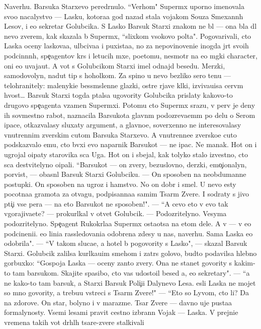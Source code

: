 \documentclass[12pt]{book}
\begin{document}
Naverhu. Barsuka Starxevo pered{\e}rnulo. ``Verhom" Superm{\yi}x uporno ime\-no\-va\-la svo{\y}o nacalystvo — Lasku, kotora{\y}a god nazad stala vojakom So{\y}uza Smexann{\yi}h Lesov, i {\y}e{\y}o sekretar{\ia} Golubcika. S Lasko{\y} Barsuk Starxi{\y} znakom ne b{\yi}l — ona b{\yi}la dl{\ia} nevo zverem, kak skazala b{\yi} Superm{\yi}x, ``slixkom v{\yi}\-so\-ko\-vo pol{\e}ta". Pogovarivali, cto Laska oceny laskova{\y}a, ul{\yi}bciva{\y}a i puxista{\y}a, no za nepovinoveni{\y}e inogda jr{\e}t svo{\y}ih podcin{\e}nn{\yi}h, spe{\c}agentov kr{\yi}s i letucih m{\yi}xe{\y}, poetomu, ne\-smo\-tr{\ia} na {\y}e{\y}o m{\ia}gki{\y} character, oni {\y}e{\y}o uvaja{\y}ut. A vot s Golubcikom Starxi{\y} imel od\-naj\-d{\yi} besedu. Merzki{\y}, samodovolyn{\yi}{\y}, nadut{\yi}{\y} tip s hoholkom. Za spino{\y} u nevo bezliko{\y} sero{\y} ten{\y}u — telohranitely: malenyki{\y}e bessm{\yi}slenn{\yi}{\y}e glazki, ostr{\yi}{\y}e rjav{\yi}{\y}e kl{\yi}ki, izviva{\y}u{\x}i{\y}sa cer\-v{\e}m hvost… Barsuk Starxi{\y} togda p{\yi}talsa ugovority Golubcika prislaty kakovo-to drugovo spe{\c}agenta vzamen Superm{\yi}xi. Potomu cto Superm{\yi}x srazu, v perv{\yi}{\y} je deny ih sovmestno{\y} rabot{\yi}, naznacila Barsukota glavn{\yi}m po\-do\-zre\-va\-{\y}e\-m{\yi}m po delu o Serom {\X}ipace, otkaz{\yi}valasy sluxaty argument{\yi}, a glavno{\y}e, soverxenno ne interesovalasy vnutrennim zverskim cut{\y}om Barsuka Starxevo. A vnutrenne{\y}e zversko{\y}e cut{\y}o podskaz{\yi}valo {\y}emu, cto b{\yi}vxi{\y} {\y}evo naparnik Barsukot — ne {\X}ipac. Ne man{\y}ak. Hot{\ia} on i ugrojal o{\x}ipaty star{\y}ov{\x}ika s{\yi}ca Uga. Hot{\ia} on i sbejal, kak tolyko stalo izvestno, cto s{\yi}ca de{\y}stvitelyno o{\x}ipali. ``Barsukot — on zvery, bezuslovno, derzki{\y}, emo{\c}ionalyn{\yi}{\y}, por{\yi}vist{\yi}{\y}, — ob{\y}asn{\ia}l Barsuk Starxi{\y} Golubciku. — On sposoben na neobdumann{\yi}{\y}e postupki. On sposoben na ugroz{\yi} i hamstvo. No on dobr{\yi}{\y} i smel{\yi}{\y}. U nevo {\y}esty pocotna{\y}a gramota za otvagu, podpisanna{\y}a samim Tsar{\e}m Zvere{\y}. I sodraty s jivo{\y} pti{\c}i vse per{\y}a — na eto Barsukot ne sposoben!". — ``A cevo eto v{\yi} {\y}evo tak v{\yi}gorajiva{\y}ete? — prokurl{\yi}kal v otvet Golubcik. — Podozritelyno. Vesyma podozritelyno. Spe{\c}agent Rukokr{\yi}la{\y}a Superm{\yi}x osta{\y}otsa na etom dele. A v{\yi} — v {\y}e{\y}o podcineni{\y}i. {\Y}e{\y}o lini{\y}a rassledovani{\y}a odobrena zdesy u nas, naverhu. Sama Laska {\y}e{\y}o odobrila". — ``V takom sluca{\y}e, {\y}a hotel b{\yi} po\-go\-vo\-rity s Lasko{\y}", — skazal Barsuk Starxi{\y}. Golubcik zalilsa kurl{\yi}ka{\y}u{\x}im smehom i zatr{\ia}s go\-lo\-vo{\y}, budto podavilsa hlebno{\y} gorbuxko{\y}: ``Gospoja Laska — oceny zan{\ia}to{\y} zvery. Ona ne stanet govority s kakim-to tam barsukom. Skajite spasibo, cto vas udostoil besed{\yi} {\y}a, {\y}e{\y}o sekretary". — ``{\Y}a ne kako{\y}-to tam barsuk, a Starxi{\y} Barsuk Poli{\c}i{\y}i Dalynevo Lesa. {\Y}esli Laska ne mojet so mno{\y} govority, {\y}a trebu{\y}u vstreci s Tsar{\e}m Zvere{\y}!" — ``Eto so Lyvom, cto li? Da na zdorov{\y}e. On star{\yi}{\y}, bolyno{\y} i v marazme. Tsar Zvere{\y} — davno uje pusta{\y}a formalynosty. Vsemi lesami pravit cestno izbrann{\yi}{\y} Vojak — Laska. V prejni{\y}e vremena takih vot dr{\ia}hl{\yi}h tsare{\y}-zvere{\y} stalkivali 
\end{document}
